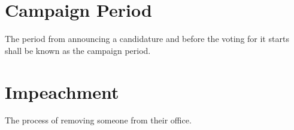 \section{Campaign Period}
The period from announcing a candidature and before the voting for it starts shall be known as the campaign period.

\section{Impeachment}
The process of removing someone from their office.